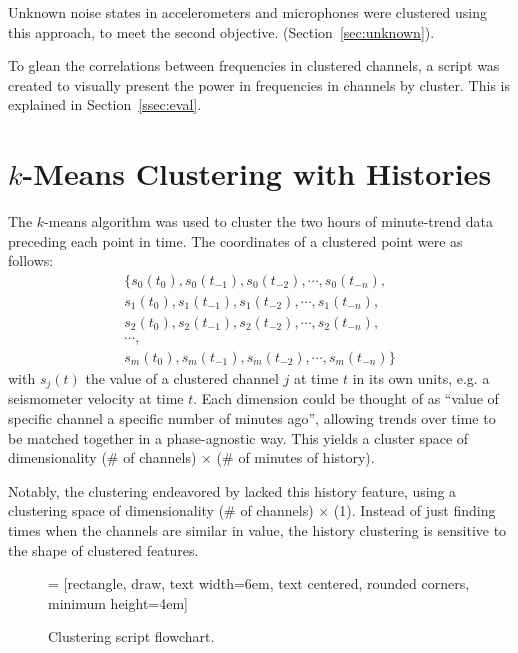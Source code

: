 \documentclass[colorlinks=true,pdfstartview=FitV,linkcolor=blue,
            citecolor=red,urlcolor=magenta]{ligodoc}
\begin{document}
Unknown noise states in accelerometers and microphones were clustered using this approach, to meet the second objective. (Section~\ref{sec:unknown}).

To glean the correlations between frequencies in clustered channels, a script was created to visually present the power in frequencies in channels by cluster. This is explained in Section~\ref{ssec:eval}.

\section{$k$-Means Clustering with Histories}\label{sec:kmeans}
The $k$-means algorithm was used to cluster the two hours of minute-trend data preceding each point in time.
The coordinates of a clustered point were as follows:
\begin{equation}
  \begin{array}{c}
    \{s_0(t_0),s_0(t_{-1}),s_0(t_{-2}),\cdots,s_0(t_{-n}),\\
    s_1(t_0),s_1(t_{-1}),s_1(t_{-2}),\cdots,s_1(t_{-n}),\\
    s_2(t_0),s_2(t_{-1}),s_2(t_{-2}),\cdots,s_2(t_{-n}),\\
    \cdots,\\
    s_m(t_0),s_m(t_{-1}),s_m(t_{-2}),\cdots,s_m(t_{-n})\}
  \end{array}
\end{equation}
with $s_j(t)$ the value of a clustered channel $j$ at time $t$ in its own units, e.g. a seismometer velocity at time $t$.
Each dimension could be thought of as ``value of specific channel a specific number of minutes ago'', allowing trends over time to be matched together in a phase-agnostic way.
This yields a cluster space of dimensionality (\# of channels) $\times$ (\# of minutes of history).

Notably, the clustering endeavored by \cite{roxana} lacked this history feature, using a clustering space of dimensionality (\# of channels) $\times$ (1).
Instead of just finding times when the channels are similar in value, the history clustering is sensitive to the shape of clustered features.

\begin{figure}[h]
   = [rectangle, draw, text width=6em, text centered, rounded corners, minimum height=4em]
  \caption{Clustering script flowchart.}
\end{figure}
\end{document}
